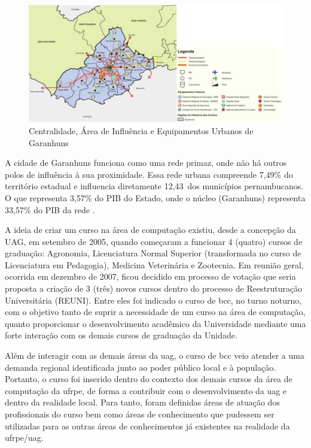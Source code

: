 \documentclass[
	12pt,				%
	openright,			%
  oneside,     %
	a4paper,			%
 hyphens,
	chapter=TITLE,		%
	english,			%
	french,				%
	spanish,			%
	brazil				%
	]{abntex2}
\begin{document}
\begin{figure}[!htb]
    \centering
    \caption{\label{fig:centralidade}Centralidade, Área de Influência e Equipamentos Urbanos de Garanhuns}
    
    \includegraphics[width=\textwidth]{images/centralidade.png}
\end{figure}


A cidade de Garanhuns funciona como uma rede primaz, onde não há outros polos de influência à sua proximidade. Essa rede urbana compreende 7,49\% do território estadual e influencia diretamente 12,43\ dos municípios pernambucanos. O que representa 3,57\% do PIB do Estado, onde o núcleo (Garanhuns) representa 33,57\% do PIB da rede \cite{fidem2017agencia}.

A ideia de criar um curso na área de computação existiu, desde a concepção da UAG, em setembro de 2005, quando começaram a funcionar 4 (quatro) cursos de graduação: Agronomia, Licenciatura Normal Superior (transformada no curso de Licenciatura em Pedagogia), Medicina Veterinária e Zootecnia. Em reunião geral, ocorrida em dezembro de 2007, ficou decidido em processo de votação que seria proposta a criação de 3 (três) novos cursos dentro do processo de Reestruturação Universitária (REUNI). Entre eles foi indicado o curso de \acrlong{bcc}, no turno noturno, com o objetivo tanto de suprir a necessidade de um curso na área de computação, quanto proporcionar o desenvolvimento acadêmico da Universidade mediante uma forte interação com os demais cursos de graduação da Unidade.

Além de interagir com as demais áreas da \acrshort{uag}, o curso de \acrlong{bcc} veio atender a uma demanda regional identificada junto ao poder público local e à população. Portanto, o curso foi inserido dentro do contexto dos demais cursos da área de computação da \acrshort{ufrpe}, de forma a contribuir com o desenvolvimento da \acrshort{uag} e dentro da realidade local. Para tanto, foram definidas áreas de atuação dos profissionais do curso bem como áreas de conhecimento que pudessem ser utilizadas para as outras áreas de conhecimentos já existentes na realidade da \acrshort{ufrpe}/\acrshort{uag}.
\end{document}
